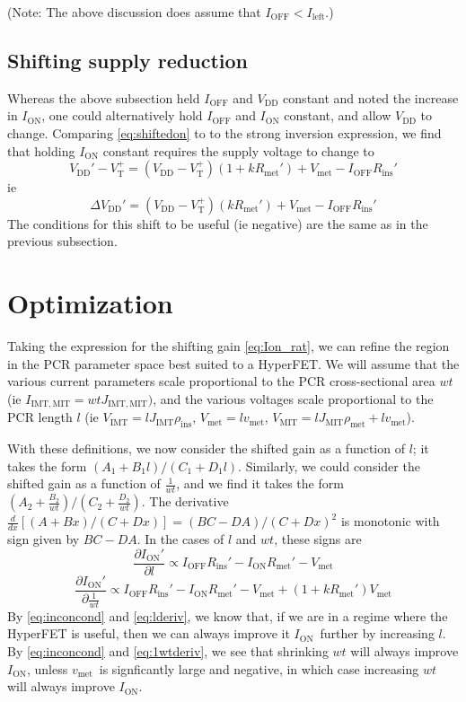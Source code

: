 \documentclass[letterpaper]{article}
\newcommand{\VTp}{\ensuremath{V_\mathrm{T}^+}}
\newcommand{\Vmet}{\ensuremath{V_\mathrm{met}}}
\newcommand{\vmet}{\ensuremath{v_\mathrm{met}}}
\newcommand{\IOFF }{\ensuremath{I_\mathrm{OFF}}}
\newcommand{\ION}{\ensuremath{I_\mathrm{ON}}}
\newcommand{\Rinsp}{\ensuremath{R_\mathrm{ins}'}}
\newcommand{\Rmetp}{\ensuremath{R_\mathrm{met}'}}
\newcommand{\pins}{\ensuremath{\rho_\mathrm{ins}}}
\newcommand{\pmet}{\ensuremath{\rho_\mathrm{met}}}
\begin{document}
(Note: The above discussion does assume that $\IOFF <I_\mathrm{left}$.)
\subsection{Shifting supply reduction}
Whereas the above subsection held $\IOFF $ and $V_\mathrm{DD}$ constant and noted the increase in $\ION$, one could alternatively hold $\IOFF $ and $\ION$ constant, and allow $V_\mathrm{DD}$ to change.  Comparing \eqref{eq:shiftedon} to to the strong inversion expression, we find that holding $\ION$ constant requires the supply voltage to change to
\begin{equation}
  V_\mathrm{DD}'-\VTp=(V_\mathrm{DD}-\VTp)(1+k\Rmetp)+V_\mathrm{met}-\IOFF \Rinsp 
  \label{eq:shiftedVDD}
\end{equation}
ie
\begin{equation}
  \Delta V_\mathrm{DD}'=(V_\mathrm{DD}-\VTp)(k\Rmetp)+V_\mathrm{met}-\IOFF \Rinsp 
  \label{eq:VDDshift}
\end{equation}
The conditions for this shift to be useful (ie negative) are the same as in the previous subsection.



\section{Optimization}
Taking the expression for the shifting gain \eqref{eq:Ion_rat}, we can refine the region in the PCR parameter space best suited to a HyperFET.  We will assume that the various current parameters scale proportional to the PCR cross-sectional area $wt$ (ie $I_\mathrm{IMT, MIT}= w t J_\mathrm{IMT, MIT})$, and the various voltages scale proportional to the PCR length $l$ (ie $V_\mathrm{IMT}=lJ_\mathrm{IMT}\pins$, $V_\mathrm{met}=lv_\mathrm{met}$, $V_\mathrm{MIT}=lJ_\mathrm{MIT}\pmet+l\vmet$).

With these definitions, we now consider the shifted gain as a function of $l$; it takes the form $(A_1+B_1l)/(C_1+D_1l)$.  Similarly, we could consider the shifted gain as a function of $\frac{1}{wt}$, and we find it takes the form $(A_2+\frac{B_2}{wt})/(C_2+\frac{D_2}{wt})$.  The derivative $\frac{d}{dx}\left[(A+Bx)/(C+Dx)\right]=(BC-DA)/(C+Dx)^2$ is monotonic with sign given by $BC-DA$.  In the cases of $l$ and $wt$, these signs are
\begin{equation}
  \frac{\partial \ION'}{\partial l}\propto\IOFF\Rinsp-\ION\Rmetp-\Vmet
  \label{eq:lderiv}
\end{equation}
\begin{equation}
  \frac{\partial \ION'}{\partial \frac{1}{wt}}\propto\IOFF\Rinsp-\ION\Rmetp-\Vmet+(1+k\Rmetp)\Vmet
  \label{eq:1wtderiv}
\end{equation}
By \eqref{eq:inconcond} and \eqref{eq:lderiv}, we know that, if we are in a regime where the HyperFET is useful, then we can always improve it \ION\ further by increasing $l$.  By \eqref{eq:inconcond} and \eqref{eq:1wtderiv}, we see that shrinking $wt$ will always improve \ION, unless \vmet\ is signficantly large and negative, in which case increasing $wt$ will always improve \ION.
\end{document}
